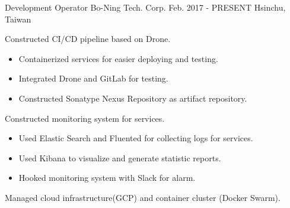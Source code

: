 

\begin{cventries}

    \cventry
        {Development Operator}
        {Bo-Ning Tech. Corp.}
        {Feb. 2017 - PRESENT}
        {Hsinchu, Taiwan}
        {
            \begin{cvitems}
                \item
                    {
                        Constructed CI/CD pipeline based on Drone.
                        \begin{itemize}
                            \item Containerized services for easier deploying and testing.
                            \item Integrated Drone and GitLab for testing.
                            \item Constructed Sonatype Nexus Repository as artifact repository.
                        \end{itemize}
                    }
                \item
                    {
                        Constructed monitoring system for services.
                        \begin{itemize}
                            \item Used Elastic Search and Fluented for collecting logs for services.
                            \item Used Kibana to visualize and generate statistic reports.
                            \item Hooked monitoring system with Slack for alarm.
                        \end{itemize}
                    }
                \item
                    {
                        Managed cloud infrastructure(GCP) and container cluster (Docker Swarm).
                    }
            \end{cvitems}
        }


\end{cventries}
